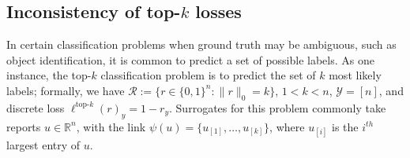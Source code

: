 \documentclass[11pt]{article}
\newcommand{\Comments}{1}
\newcommand{\mynote}[2]{\ifnum\Comments=1\textcolor{#1}{#2}\fi}
\newcommand{\mytodo}[2]{\ifnum\Comments=1%
  \todo[linecolor=#1!80!black,backgroundcolor=#1,bordercolor=#1!80!black]{#2}\fi}
\newcommand{\raf}[1]{\mynote{darkgreen}{[RF: #1]}}
\newcommand{\jessiet}[1]{\mytodo{teal!20!white}{JF: #1}}
\newcommand{\reals}{\mathbb{R}}
\newcommand{\E}{\mathbb{E}}
\newcommand{\R}{\mathcal{R}}
\newcommand{\Y}{\mathcal{Y}}
\newcommand{\risk}[1]{\underline{#1}}
\newcommand{\inprod}[2]{\langle #1, #2 \rangle}%
\newcommand{\ones}{\mathbbm{1}}
\newcommand{\Ind}[1]{\ones\{#1\}}
\newcommand{\elltopk}{\ell^{\text{top-$k$}}}
\begin{document}


\subsection{Inconsistency of top-$k$ losses}

In certain classification problems when ground truth may be ambiguous, such as object identification, it is common to predict a set of possible labels.
As one instance, the top-$k$ classification problem is to predict the set of $k$ most likely labels; formally, we have $\R := \{r \in \{0,1\}^n : \|r\|_0 = k\}$, $1<k<n$, $\Y = [n]$, and discrete loss $\elltopk(r)_y = 1-r_y$.
Surrogates for this problem commonly take reports $u\in\reals^n$, with the link $\psi(u) = \{u_{[1]},\ldots,u_{[k]}\}$, where $u_{[i]}$ is the $i^{th}$ largest entry of $u$.
\end{document}
